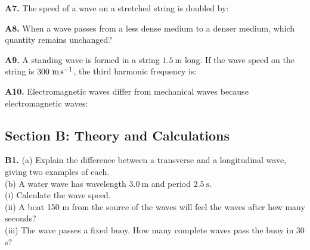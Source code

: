 \begin{exercisebox}[17]

\vspace{0.4cm}

\textbf{A7.} The speed of a wave on a stretched
string is doubled by:


\vspace{0.4cm}

\textbf{A8.} When a wave passes from a less dense
medium to a denser medium, which quantity remains
unchanged?


\vspace{0.4cm}

\textbf{A9.} A standing wave is formed in a string
$1.5\ \text{m}$ long. If the wave speed on the
string is $300\ \text{m\,s}^{-1}$, the third
harmonic frequency is:


\vspace{0.4cm}

\textbf{A10.} Electromagnetic waves differ from
mechanical waves because electromagnetic waves:


\vspace{0.6cm}

\subsection*{Section B: Theory and Calculations}

\textbf{B1.} (a) Explain the difference between
a transverse and a longitudinal wave, giving two
examples of each.\\[4pt]
(b) A water wave has wavelength $3.0\ \text{m}$
and period $2.5\ \text{s}$.\\
(i) Calculate the wave speed.\\
(ii) A boat 150 m from the source of the waves
will feel the waves after how many seconds?\\
(iii) The wave passes a fixed buoy. How many
complete waves pass the buoy in 30 s?
\hfill{}


\end{exercisebox}
